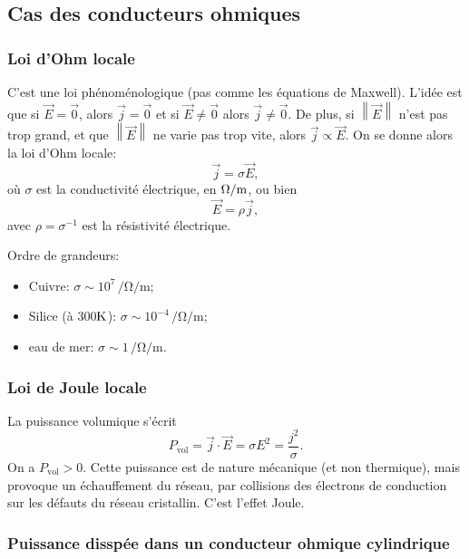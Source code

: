 \subsection{Cas des conducteurs ohmiques}
\subsubsection{Loi d'Ohm locale}

C'est une loi phénoménologique (pas comme les équations de Maxwell). L'idée est que si $\vec{E}=\vec{0}$, alors $\vec{j}=\vec{0}$ et si $\vec{E}\neq\vec{0}$ alors $\vec{j}\neq\vec{0}$. De plus, si $\left\lVert\vec{E}\right\rVert$ n'est \og pas trop grand\fg, et que $\left\lVert\vec{E}\right\rVert$ ne varie pas trop vite, alors $\vec{j}\propto\vec{E}$. On se donne alors la loi d'Ohm locale:
\begin{equation*}
    \boxed{
        \vec{j}=\sigma\vec{E},
    }
\end{equation*}
où $\sigma$ est la conductivité électrique, en $\si[]{\per\Omega\per\metre}$, ou bien
\begin{equation*}
    \boxed{
        \vec{E}=\rho\vec{j},
    }
\end{equation*}
avec $\rho=\sigma^{-1}$ est la résistivité électrique.

Ordre de grandeurs:
\begin{itemize}
    \item Cuivre: $\sigma\sim10^{7}\,\si{\per\ohm\per\metre}$;
    \item Silice (à 300$\si[]{\kelvin}$): $\sigma\sim10^{-4}\,\si{\per\ohm\per\metre}$;
    \item eau de mer: $\sigma\sim1\,\si{\per\ohm\per\metre}$.
\end{itemize}

\subsubsection{Loi de Joule locale}

La puissance volumique s'écrit
\begin{equation*}
    \boxed{
        P_{\mathrm{vol}}=\vec{j}\cdot\vec{E}=\sigma E^{2}=\frac{j^{2}}{\sigma}.
    }
\end{equation*}
On a $P_{\mathrm{vol}}>0$. Cette puissance est de nature mécanique (et non thermique), mais provoque un échauffement du réseau, par collisions des électrons de conduction sur les défauts du réseau cristallin. C'est l'effet Joule.

\subsubsection{Puissance disspée dans un conducteur ohmique cylindrique}

